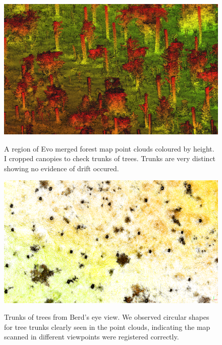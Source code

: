 \begin{figure}[t]
  \centering
  \includegraphics[width=0.9\columnwidth]{pics/exp_3_offline_pointclouds_trunk.png}\label{fig:truk of trees}
  \caption{A region of Evo merged forest map point clouds coloured by height. I cropped canopies to check trunks of trees. Trunks are very distinct showing no evidence of drift occured.}
  \includegraphics[width=0.9\columnwidth]{pics/exp_3_offline_pointclouds_trunk_BV3.png}\label{fig:trunk of trees BV}
  \caption{Trunks of trees from Berd's eye view. We observed circular shapes for tree trunks clearly seen in the point clouds, indicating the map scanned in different viewpoints were registered correctly.}
\end{figure}







